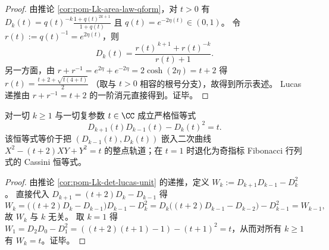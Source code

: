 \begin{proof}
由推论 \ref{cor:pom-Lk-area-law-qform}，对 \(t>0\) 有
\(
D_k(t)=q(t)^{-k}\frac{1+q(t)^{2k+1}}{1+q(t)}
\)
且 \(q(t)=e^{-2\eta(t)}\in(0,1)\)。
令 \(r(t):=q(t)^{-1}=e^{2\eta(t)}\)，则
\[
D_k(t)=\frac{r(t)^{\,k+1}+r(t)^{-k}}{r(t)+1}.
\]
另一方面，由 \(r+r^{-1}=e^{2\eta}+e^{-2\eta}=2\cosh(2\eta)=t+2\) 得
\(
r(t)=\frac{t+2+\sqrt{t(4+t)}}{2}
\)
（取与 \(t>0\) 相容的根号分支），故得到所示表述。
Lucas 递推由 \(r+r^{-1}=t+2\) 的一阶消元直接得到。证毕。
\end{proof}

\begin{proposition}\label{prop:pom-Lk-det-cassini-pell}
对一切 \(k\ge 1\) 与一切复参数 \(t\in\CC\) 成立严格恒等式
\[
\boxed{\;
D_{k+1}(t)D_{k-1}(t)-D_k(t)^2=t.\;}
\]
该恒等式等价于把 \((D_{k-1}(t),D_k(t))\) 嵌入二次曲线
\(
X^2-(t+2)XY+Y^2=t
\)
的整点轨道；在 \(t=1\) 时退化为奇指标 Fibonacci 行列式的 Cassini 恒等式。
\end{proposition}

\begin{proof}
由推论 \ref{cor:pom-Lk-det-lucas-unit} 的递推，定义
\(
W_k:=D_{k+1}D_{k-1}-D_k^2
\)。
直接代入 \(D_{k+1}=(t+2)D_k-D_{k-1}\) 得
\[
W_k=\bigl((t+2)D_k-D_{k-1}\bigr)D_{k-1}-D_k^2
=D_k\bigl((t+2)D_{k-1}-D_{k-2}\bigr)-D_{k-1}^2
=W_{k-1},
\]
故 \(W_k\) 与 \(k\) 无关。
取 \(k=1\) 得
\(
W_1=D_2D_0-D_1^2=((t+2)(t+1)-1)- (t+1)^2=t
\)，从而对所有 \(k\ge 1\) 有 \(W_k=t\)。证毕。
\end{proof}

